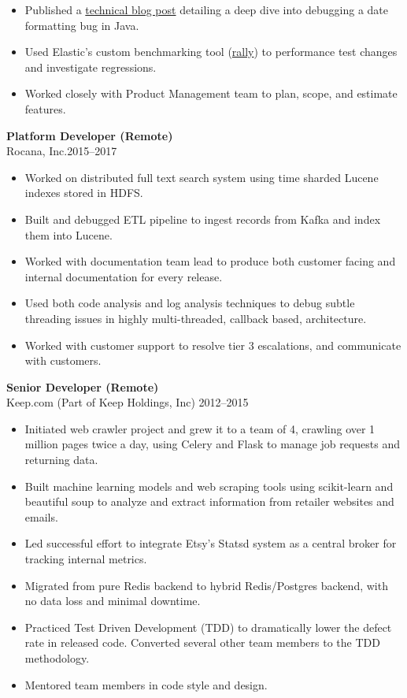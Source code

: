 \documentclass[margin]{res}
\begin{document}
\begin{resume}
\begin{itemize}
            by other developers as AI Agent formulas for complex coding tasks.
        \item Published a
            \href{https://www.elastic.co/blog/how-elastic-traced-a-formatting-bug-in-elasticsearch}{technical blog
            post} detailing a deep dive into debugging a date formatting bug in Java.
        \item Used Elastic's custom benchmarking tool (\href{https://github.com/elastic/rally}{rally})
            to performance test changes and investigate regressions.
        \item Worked closely with Product Management team to plan, scope, and
            estimate features.
    \end{itemize}
{\bf Platform Developer (Remote)}\\
    Rocana, Inc.\hfill 2015--2017
\begin{itemize}
    \item Worked on distributed full text search system using time sharded
        Lucene indexes stored in HDFS.
    \item Built and debugged ETL pipeline to ingest records from Kafka
        and index them into Lucene.
    \item Worked with documentation team lead to produce both customer facing
        and internal documentation for every release.
    \item Used both code analysis and log analysis techniques to debug subtle
        threading issues in highly multi-threaded, callback based, architecture.
    \item Worked with customer support to resolve tier 3 escalations, and
        communicate with customers.
\end{itemize}

{\bf Senior Developer (Remote)}\\
    Keep.com (Part of Keep Holdings, Inc) \hfill 2012--2015
\begin{itemize}
  \item Initiated web crawler project and grew it to a team of 4, crawling
    over 1 million pages twice a day, using Celery and Flask to manage job
    requests and returning data.
  \item Built machine learning models and web scraping tools using
    scikit-learn and beautiful soup to analyze and extract information from
    retailer websites and emails.
  \item Led successful effort to integrate Etsy's Statsd system as a central
    broker for tracking internal metrics.
  \item Migrated from pure Redis backend to hybrid Redis/Postgres backend,
      with no data loss and minimal downtime.
  \item Practiced Test Driven Development (TDD) to dramatically lower the
      defect rate in released code.  Converted several other team members to
      the TDD methodology.
  \item Mentored team members in code style and design.
\end{itemize}


\end{resume}
\end{document}
